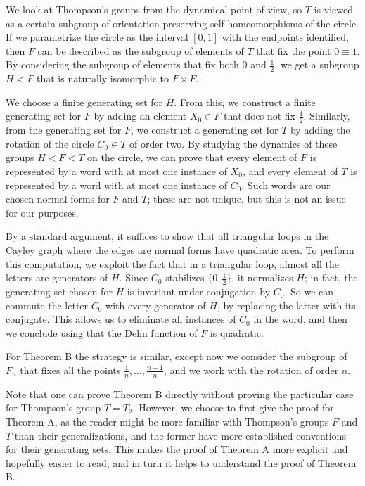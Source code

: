 We look at Thompson's groups from the dynamical point of view, so $T$ is viewed as a certain subgroup of orientation-preserving self-homeomorphisms of the circle. If we parametrize the circle as the interval $[0,1]$ with the endpoints identified, then $F$ can be described as the subgroup of elements of $T$ that fix the point $0\equiv 1$. By considering the subgroup of elements that fix both $0$ and $\frac12$, we get a subgroup $H<F$ that is naturally isomorphic to $F\times F$.

We choose a finite generating set for $H$. From this, we construct a finite generating set for $F$ by adding an element $X_0\in F$ that does not fix $\frac12$. Similarly, from the generating set for $F$, we construct a generating set for $T$ by adding the rotation of the circle $C_0\in T$ of order two. By studying the dynamics of these groups $H<F<T$ on the circle, we can prove that every element of $F$ is represented by a word with at most one instance of $X_0$, and every element of $T$ is represented by a word with at most one instance of $C_0$. Such words are our chosen normal forms for $F$ and $T$; these are not unique, but this is not an issue for our purposes.

By a standard argument, it suffices to show that all triangular loops in the Cayley graph where the edges are normal forms have quadratic area. To perform this computation, we exploit the fact that in a triangular loop, almost all the letters are generators of $H$. Since $C_0$ stabilizes $\{0,\frac12\}$, it normalizes $H$; in fact, the generating set chosen for $H$ is invariant under conjugation by $C_0$. So we can commute the letter $C_0$ with every generator of $H$, by replacing the latter with its conjugate. This allows us to eliminate all instances of $C_0$ in the word, and then we conclude using that the Dehn function of $F$ is quadratic.

For Theorem B the strategy is similar, except now we consider the subgroup of $F_n$ that fixes all the points $\frac1n,\ldots,\frac{n-1}{n}$, and we work with the rotation of order $n$.

Note that one can prove Theorem B directly without proving the particular case for Thompson's group $T=T_2$. However, we choose to first give the proof for Theorem A, as the reader might be more familiar with Thompson's groups $F$ and $T$ than their generalizations, and the former have more established conventions for their generating sets. This makes the proof of Theorem A more explicit and hopefully easier to read, and in turn it helps to understand the proof of Theorem B.

